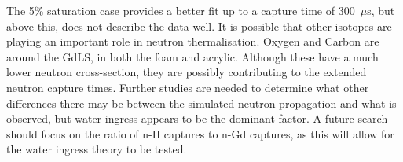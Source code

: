 \par
The 5\% saturation case provides a better fit up to a capture time of 300~$\mu$s, but above this, does not describe the data well.
It is possible that other isotopes are playing an important role in neutron thermalisation.
Oxygen and Carbon are around the GdLS, in both the foam and acrylic.
Although these have a much lower neutron cross-section, they are possibly contributing to the extended neutron capture times.
Further studies are needed to determine what other differences there may be between the simulated neutron propagation and what is observed, but water ingress appears to be the dominant factor.
A future search should focus on the ratio of n-H captures to n-Gd captures, as this will allow for the water ingress theory to be tested.




